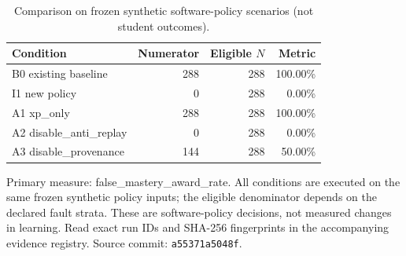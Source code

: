 \begin{table}[htbp]
\centering
\small
\caption{Comparison on frozen synthetic software-policy scenarios (not student outcomes).}
\label{tab:ln-05-policy-benchmark}
\begin{tabular}{lrrr}
\toprule
Condition & Numerator & Eligible $N$ & Metric \\
\midrule
B0 existing baseline & 288 & 288 & 100.00\% \\
I1 new policy & 0 & 288 & 0.00\% \\
A1 xp\_only & 288 & 288 & 100.00\% \\
A2 disable\_anti\_replay & 0 & 288 & 0.00\% \\
A3 disable\_provenance & 144 & 288 & 50.00\% \\
\bottomrule
\end{tabular}
\par\smallskip
\begin{minipage}{0.98\linewidth}\footnotesize
Primary measure: false\_mastery\_award\_rate. All conditions are executed on the same frozen synthetic policy inputs; the eligible denominator depends on the declared fault strata. These are software-policy decisions, not measured changes in learning. Read exact run IDs and SHA-256 fingerprints in the accompanying evidence registry. Source commit: \texttt{a55371a5048f}.
\end{minipage}
\end{table}
